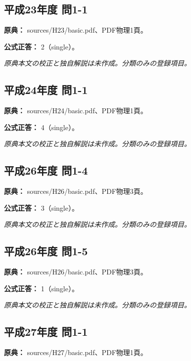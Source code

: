 \subsection{平成23年度 問1-1}
\label{q:h23-reg-basic-1-1}

\noindent\textbf{原典：} sources/H23/basic.pdf、PDF物理1頁。

\textbf{公式正答：} 2（single）。

\par\textit{原典本文の校正と独自解説は未作成。分類のみの登録項目。}

\subsection{平成24年度 問1-1}
\label{q:h24-reg-basic-1-1}

\noindent\textbf{原典：} sources/H24/basic.pdf、PDF物理1頁。

\textbf{公式正答：} 4（single）。

\par\textit{原典本文の校正と独自解説は未作成。分類のみの登録項目。}

\subsection{平成26年度 問1-4}
\label{q:h26-reg-basic-1-4}

\noindent\textbf{原典：} sources/H26/basic.pdf、PDF物理3頁。

\textbf{公式正答：} 3（single）。

\par\textit{原典本文の校正と独自解説は未作成。分類のみの登録項目。}

\subsection{平成26年度 問1-5}
\label{q:h26-reg-basic-1-5}

\noindent\textbf{原典：} sources/H26/basic.pdf、PDF物理3頁。

\textbf{公式正答：} 1（single）。

\par\textit{原典本文の校正と独自解説は未作成。分類のみの登録項目。}

\subsection{平成27年度 問1-1}
\label{q:h27-reg-basic-1-1}

\noindent\textbf{原典：} sources/H27/basic.pdf、PDF物理1頁。

